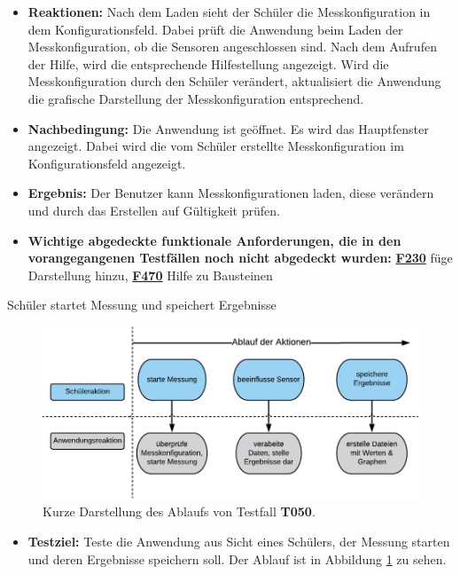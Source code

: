 \documentclass[parskip=full]{scrartcl}
\begin{document}
\begin{description}
\begin{itemize}
\item []\textbf{Reaktionen:} Nach dem Laden sieht der Schüler die Messkonfiguration in dem Konfigurationsfeld. Dabei prüft die Anwendung beim Laden der Messkonfiguration, ob die Sensoren angeschlossen sind.  Nach dem Aufrufen der Hilfe, wird die entsprechende Hilfestellung angezeigt. Wird die Messkonfiguration durch den Schüler verändert, aktualisiert die Anwendung die grafische Darstellung der Messkonfiguration entsprechend. 
\item []\textbf{Nachbedingung:} Die Anwendung ist geöffnet. Es wird das Hauptfenster angezeigt. Dabei wird die vom Schüler erstellte Messkonfiguration im Konfigurationsfeld angezeigt.


\item []\textbf{Ergebnis:} Der Benutzer kann Messkonfigurationen laden, diese verändern und durch das Erstellen auf Gültigkeit prüfen. 
\item []\textbf{Wichtige abgedeckte funktionale Anforderungen, die in den vorangegangenen Testfällen noch nicht abgedeckt wurden:} \hyperlink{link-f230}{\textbf{F230}} füge Darstellung hinzu, \hyperlink{link-f470}{\textbf{F470}} Hilfe zu Bausteinen

\end{itemize}

\hypertarget{link-t050}{\item[T050]} Schüler startet Messung und speichert Ergebnisse

\begin{figure}[htbp]
	\begin{center}
		\includegraphics[width = 13cm]{Grafik/T050-Ablauf.png}
		\caption{Kurze Darstellung des Ablaufs von Testfall \textbf{T050}.}
		\label{T050-Ablauf}
	\end{center}
\end{figure}
\begin{itemize}

\item []\textbf{Testziel:} Teste die Anwendung aus Sicht eines Schülers, der Messung starten und deren Ergebnisse speichern soll. Der Ablauf ist in Abbildung \ref{T050-Ablauf} zu sehen.


\end{itemize}
\end{description}
\end{document}
